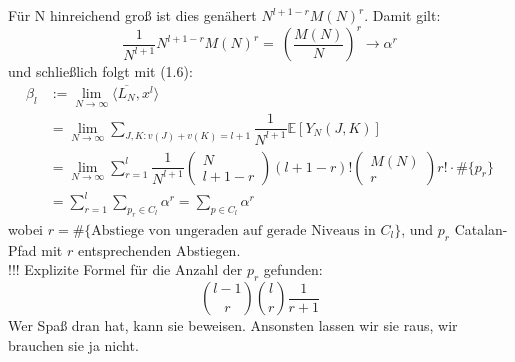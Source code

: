 \documentclass[a4paper, 11pt]{scrreprt}
\newcommand{\EE}{\mathbb{E}}
\begin{document}
Für N hinreichend groß ist dies genähert \(N^{l+1-r}M(N)^r\). Damit gilt:
	\begin{equation}
		\frac {1}{N^{l+1}} N^{l+1-r}M(N)^r =~ \left( \dfrac{M(N)}{N}\right)^{r}\to \alpha^r
	\end{equation}
und schließlich folgt mit (1.6):
	\begin{align*}
		\beta_l &:= \lim_{N\to\infty} \langle \overline{L_N}, x^l \rangle\\
		&= \lim_{N \to \infty} \sum_{J,K: v(J)+v(K) = l+1} \dfrac{1}{N^{l+1}}\EE[Y_N(J,K)]\\
		&= \lim_{N \to \infty} \sum_{r=1}^{l} \dfrac{1}{N^{l+1}} \begin{pmatrix} N\\ l+1-r\end{pmatrix} (l+1-r)! \begin{pmatrix} M(N)\\r\end{pmatrix} r!	\cdot \#\{p_r \}\\
		&= \sum_{r=1}^{l} \sum_{p_{r} \in C_{l}} \alpha^{r} = \sum_{p\in C_l} \alpha^r
	\end{align*}
wobei \(r=\#\{\text{Abstiege von ungeraden auf gerade Niveaus in } C_l\}\), und \(p_r\) Catalan-Pfad mit \(r\) entsprechenden Abstiegen.\\

!!! Explizite Formel für die Anzahl der $ p_r $ gefunden: \[ \binom{l-1}{r} \binom{l}{r} \frac{1}{r+1} \]
Wer Spaß dran hat, kann sie beweisen. Ansonsten lassen wir sie raus, wir brauchen sie ja nicht.\\
\end{document}
